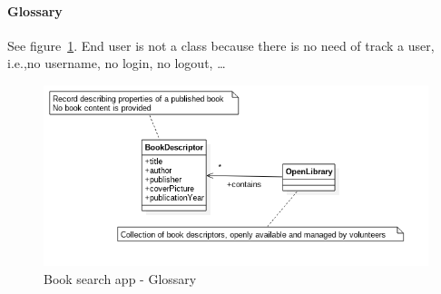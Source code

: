 \paragraph{Glossary}
See figure~\ref{img:book_glossary}. End user is not a class because there is no need of track a user, i.e.,\@ no username, no login, no logout, \dots

\begin{figure}[hbtp]
\centering
\includegraphics[scale=0.45]{exercises/book_glossary.png}
\caption{Book search app - Glossary}
\label{img:book_glossary}
\end{figure}